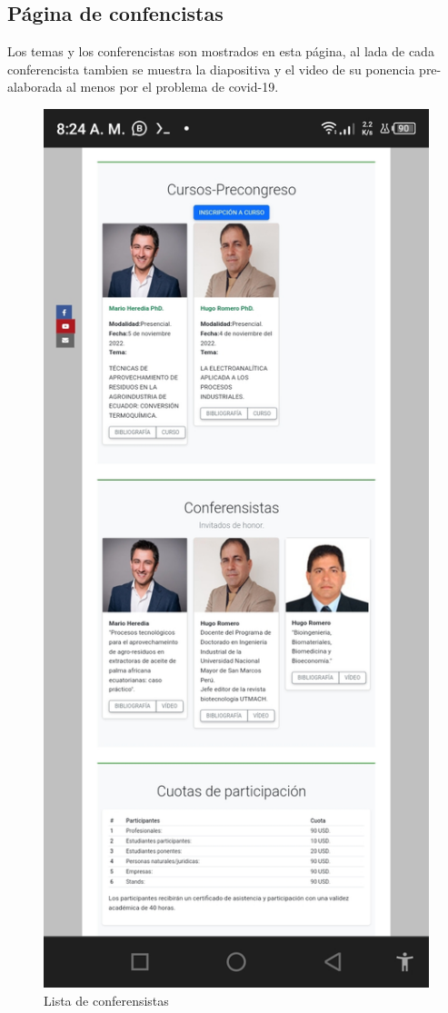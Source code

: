 \documentclass[a4paper,14px]{article}
\begin{document}
\newpage
\subsection{Página de confencistas }
\label{sec:pagina-principal}

Los temas y los conferencistas son mostrados en esta página, al lada de cada conferencista tambien se muestra la diapositiva y el video de su ponencia pre-alaborada al menos por el problema de covid-19.

  

\begin{minipage}[H]{0.5\linewidth}
  \begin{figure}[H]
    \centering
    \includegraphics[scale=0.3]{conferencistas.jpg}
    \caption{Lista de conferensistas}
    \label{fig:conferensistas}
  \end{figure}
\end{minipage}
\end{document}
